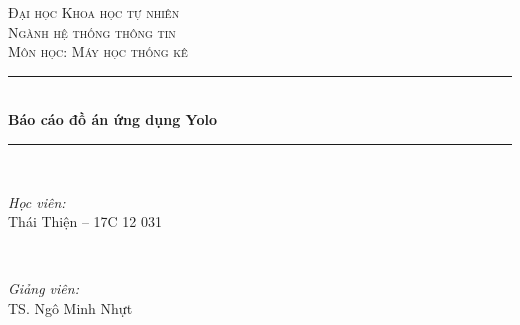 \begin{titlepage}

\newcommand{\HRule}{\rule{\linewidth}{0.5mm}} %

\center %
 

\textsc{\LARGE Đại học Khoa học tự nhiên}\\[1.5cm] %
\textsc{\Large Ngành hệ thống thông tin}\\[0.5cm] %
\textsc{\large Môn học: Máy học thống kê }\\[0.5cm] %


\HRule \\[0.4cm]
{ \huge \bfseries Báo cáo đồ án ứng dụng Yolo}\\[0.4cm] %
\HRule \\[1.5cm]
 

\begin{minipage}{0.4\textwidth}
\begin{flushleft} \large
\emph{Học viên:}\\
Thái Thiện -- 17C 12 031 %
\end{flushleft}
\end{minipage}
~
\begin{minipage}{0.4\textwidth}
\begin{flushright} \large
\emph{Giảng viên:} \\
TS. Ngô Minh Nhựt %
\end{flushright}
\end{minipage}\\[2cm]



\end{titlepage}
